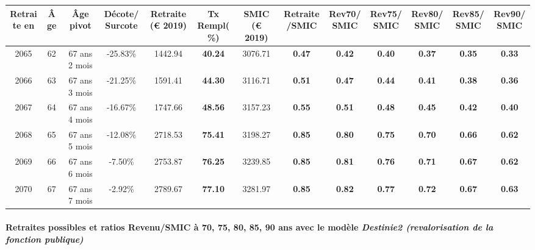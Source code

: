 { \scriptsize \begin{center} 
\begin{tabular}[htb]{|c|c||c|c||c|c||c||c|c|c|c|c|c|} 
\hline 
 Retraite en &  Âge &  Âge pivot &  Décote/Surcote &  Retraite (\euro{} 2019) &  Tx Rempl(\%) &  SMIC (\euro{} 2019) &  Retraite/SMIC &  Rev70/SMIC &  Rev75/SMIC &  Rev80/SMIC &  Rev85/SMIC &  Rev90/SMIC \\ 
\hline \hline 
 2065 &  62 &  67 ans 2 mois &  -25.83\% &  1442.94 &  {\bf 40.24} &  3076.71 &  {\bf {\color{red} 0.47}} &  {\bf {\color{red} 0.42}} &  {\bf {\color{red} 0.40}} &  {\bf {\color{red} 0.37}} &  {\bf {\color{red} 0.35}} &  {\bf {\color{red} 0.33}} \\ 
\hline 
 2066 &  63 &  67 ans 3 mois &  -21.25\% &  1591.41 &  {\bf 44.30} &  3116.71 &  {\bf {\color{red} 0.51}} &  {\bf {\color{red} 0.47}} &  {\bf {\color{red} 0.44}} &  {\bf {\color{red} 0.41}} &  {\bf {\color{red} 0.38}} &  {\bf {\color{red} 0.36}} \\ 
\hline 
 2067 &  64 &  67 ans 4 mois &  -16.67\% &  1747.66 &  {\bf 48.56} &  3157.23 &  {\bf {\color{red} 0.55}} &  {\bf {\color{red} 0.51}} &  {\bf {\color{red} 0.48}} &  {\bf {\color{red} 0.45}} &  {\bf {\color{red} 0.42}} &  {\bf {\color{red} 0.40}} \\ 
\hline 
 2068 &  65 &  67 ans 5 mois &  -12.08\% &  2718.53 &  {\bf 75.41} &  3198.27 &  {\bf {\color{red} 0.85}} &  {\bf {\color{red} 0.80}} &  {\bf {\color{red} 0.75}} &  {\bf {\color{red} 0.70}} &  {\bf {\color{red} 0.66}} &  {\bf {\color{red} 0.62}} \\ 
\hline 
 2069 &  66 &  67 ans 6 mois &  -7.50\% &  2753.87 &  {\bf 76.25} &  3239.85 &  {\bf {\color{red} 0.85}} &  {\bf {\color{red} 0.81}} &  {\bf {\color{red} 0.76}} &  {\bf {\color{red} 0.71}} &  {\bf {\color{red} 0.67}} &  {\bf {\color{red} 0.62}} \\ 
\hline 
 2070 &  67 &  67 ans 7 mois &  -2.92\% &  2789.67 &  {\bf 77.10} &  3281.97 &  {\bf {\color{red} 0.85}} &  {\bf {\color{red} 0.82}} &  {\bf {\color{red} 0.77}} &  {\bf {\color{red} 0.72}} &  {\bf {\color{red} 0.67}} &  {\bf {\color{red} 0.63}} \\ 
\hline 
\hline 
\end{tabular} 
\end{center} } 
\paragraph{Retraites possibles et ratios Revenu/SMIC à 70, 75, 80, 85, 90 ans avec le modèle \emph{Destinie2 (revalorisation de la fonction publique)}}  
 
